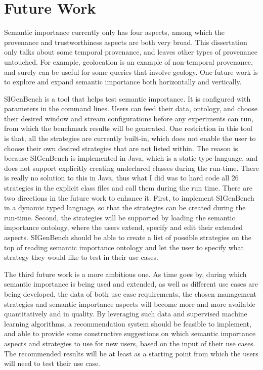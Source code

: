 \section{Future Work}
Semantic importance currently only has four aspects, among which the provenance and trustworthiness aspects are both very broad. 
This dissertation only talks about some temporal provenance, and leaves other types of provenance untouched. 
For example, geolocation is an example of non-temporal provenance, and surely can be useful for some queries that involve geology.
One future work is to explore and expand semantic importance both horizontally and vertically.

SIGenBench is a tool that helps test semantic importance.
It is configured with parameters in the command lines. 
Users can feed their data, ontology, and choose their desired window and stream configurations before any experiments can run, from which the benchmark results will be generated.
One restriction in this tool is that, all the strategies are currently built-in, which does not enable the user to choose their own desired strategies that are not listed within. 
The reason is because SIGenBench is implemented in Java, which is a static type language, and does not support explicitly creating undeclared classes during the run-time. 
There is really no solution to this in Java, thus what I did was to hard code all 26 strategies in the explicit class files and call them during the run time.
There are two directions in the future work to enhance it.
First, to implement SIGenBench in a dynamic typed language, so that the strategies can be created during the run-time.
Second, the strategies will be supported by loading the semantic importance ontology, where the users extend, specify and edit their extended aspects.
SIGenBench should be able to create a list of possible strategies on the top of reading semantic importance ontology and let the user to specify what strategy they would like to test in their use cases. 

The third future work is a more ambitious one.
As time goes by, during which semantic importance is being used and extended, as well as different use cases are being developed, the data of both use case requirements, the chosen management strategies and semantic importance aspects will become more and more available quantitatively and in quality.
By leveraging such data and supervised machine learning algorithms, a recommendation system should be feasible to implement, and able to provide some constructive suggestions on which semantic importance aspects and strategies to use for new users, based on the input of their use cases. 
The recommended results will be at least as a starting point from which the users will need to test their use case. 